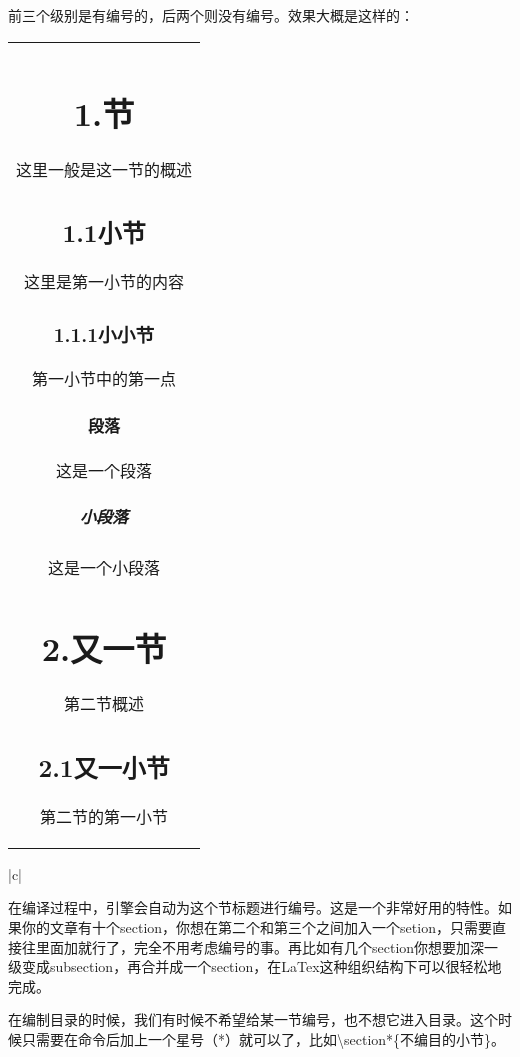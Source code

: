 \documentclass[UTF8,a4paper]{ctexart}
\begin{document}
        前三个级别是有编号的，后两个则没有编号。效果大概是这样的：

            \begin{tabular}{|c|}
                \hline
                \parbox{\textwidth}{
                    \section*{1.节}
                        这里一般是这一节的概述
                        \subsection*{1.1小节}
                            这里是第一小节的内容
                            \subsubsection*{1.1.1小小节}
                                第一小节中的第一点
                                \paragraph{段落}
                                    这是一个段落
                                    \subparagraph{小段落}
                                        这是一个小段落
                    \section*{2.又一节}
                        第二节概述
                        \subsection*{2.1又一小节}
                            第二节的第一小节
                }\\
                \hline
            \end{tabular}{|c|}

        在编译过程中，引擎会自动为这个节标题进行编号。这是一个非常好用的特性。如果你的文章有十个section，你想在第二个和第三个之间加入一个setion，只需要直接往里面加就行了，完全不用考虑编号的事。再比如有几个section你想要加深一级变成subsection，再合并成一个section，在LaTex这种组织结构下可以很轻松地完成。

        在编制目录的时候，我们有时候不希望给某一节编号，也不想它进入目录。这个时候只需要在命令后加上一个星号（*）就可以了，比如\textbackslash section*\{不编目的小节\}。
\end{document}
